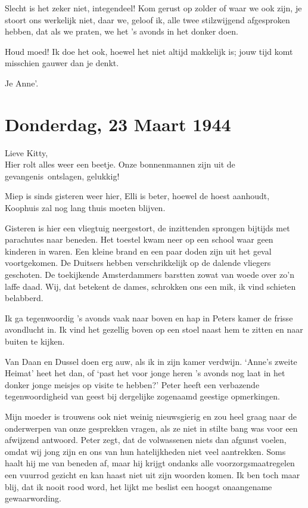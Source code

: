\documentclass{book}
\begin{document}
Slecht is het zeker niet, integendeel! Kom gerust op zolder of waar we
ook zijn, je stoort ons werkelijk niet, daar we, geloof ik, alle twee
stilzwijgend afgesproken hebben, dat als we praten, we het 's avonds in
het donker doen.

Houd moed! Ik doe het ook, hoewel het niet altijd makkelijk is; jouw
tijd komt misschien gauwer dan je denkt.

Je Anne'.

\chapter{Donderdag, 23 Maart 1944}

Lieve Kitty,\\Hier rolt alles weer een beetje. Onze bonnenmannen zijn
uit de gevangenis~ontslagen, gelukkig!

Miep is sinds gisteren weer hier, Elli is beter, hoewel de hoest
aanhoudt, Koophuis zal nog lang thuis moeten blijven.

Gisteren is hier een vliegtuig neergestort, de inzittenden sprongen
bijtijds met parachutes naar beneden. Het toestel kwam neer op een
school waar geen kinderen in waren. Een kleine brand en een paar doden
zijn uit het geval voortgekomen. De Duitsers hebben verschrikkelijk op
de dalende vliegers geschoten. De toekijkende Amsterdammers barstten
zowat van woede over zo'n laffe daad. Wij, dat betekent de dames,
schrokken ons een mik, ik vind schieten belabberd.

Ik ga tegenwoordig 's avonds vaak naar boven en hap in Peters kamer de
frisse avondlucht in. Ik vind het gezellig boven op een stoel naast hem
te zitten en naar buiten te kijken.

Van Daan en Dussel doen erg auw, als ik in zijn kamer verdwijn. `Anne's
zweite Heimat' heet het dan, of `past het voor jonge heren 's avonds nog
laat in het donker jonge meisjes op visite te hebben?' Peter heeft een
verbazende tegenwoordigheid van geest bij dergelijke zogenaamd geestige
opmerkingen.

Mijn moeder is trouwens ook niet weinig nieuwsgierig en zou heel graag
naar de onderwerpen van onze gesprekken vragen, als ze niet in stilte
bang was voor een afwijzend antwoord. Peter zegt, dat de volwassenen
niets dan afgunst voelen, omdat wij jong zijn en ons van hun
hatelijkheden niet veel aantrekken. Soms haalt hij me van beneden af,
maar hij krijgt ondanks alle voorzorgsmaatregelen een vuurrod gezicht en
kan haast niet uit zijn woorden komen. Ik ben toch maar blij, dat ik
nooit rood word, het lijkt me beslist een hoogst onaangename
gewaarwording.
\end{document}
